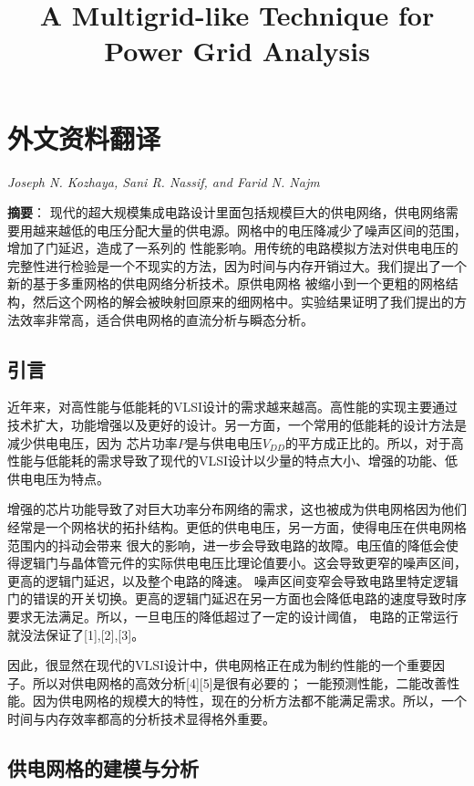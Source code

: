 \chapter{外文资料翻译}
\label{cha:engorg}

\title{A Multigrid-like Technique for Power Grid Analysis}
\begin{center}\emph{Joseph N. Kozhaya, Sani R. Nassif, and Farid N. Najm}\end{center}
\textbf{摘要}：
现代的超大规模集成电路设计里面包括规模巨大的供电网络，供电网络需要用越来越低的电压分配大量的供电源。网格中的电压降减少了噪声区间的范围，增加了门延迟，造成了一系列的
性能影响。用传统的电路模拟方法对供电电压的完整性进行检验是一个不现实的方法，因为时间与内存开销过大。我们提出了一个新的基于多重网格的供电网络分析技术。原供电网格
被缩小到一个更粗的网格结构，然后这个网格的解会被映射回原来的细网格中。实验结果证明了我们提出的方法效率非常高，适合供电网格的直流分析与瞬态分析。

\section{引言}

近年来，对高性能与低能耗的VLSI设计的需求越来越高。高性能的实现主要通过技术扩大，功能增强以及更好的设计。另一方面，一个常用的低能耗的设计方法是减少供电电压，因为
芯片功率$P$是与供电电压$V_{DD}$的平方成正比的。所以，对于高性能与低能耗的需求导致了现代的VLSI设计以少量的特点大小、增强的功能、低供电电压为特点。

增强的芯片功能导致了对巨大功率分布网络的需求，这也被成为供电网格因为他们经常是一个网格状的拓扑结构。更低的供电电压，另一方面，使得电压在供电网格范围内的抖动会带来
很大的影响，进一步会导致电路的故障。电压值的降低会使得逻辑门与晶体管元件的实际供电电压比理论值要小。这会导致更窄的噪声区间，更高的逻辑门延迟，以及整个电路的降速。
噪声区间变窄会导致电路里特定逻辑门的错误的开关切换。更高的逻辑门延迟在另一方面也会降低电路的速度导致时序要求无法满足。所以，一旦电压的降低超过了一定的设计阈值，
电路的正常运行就没法保证了[1],[2],[3]。

因此，很显然在现代的VLSI设计中，供电网格正在成为制约性能的一个重要因子。所以对供电网格的高效分析[4][5]是很有必要的；
一能预测性能，二能改善性能。因为供电网格的规模大的特性，现在的分析方法都不能满足需求。所以，一个时间与内存效率都高的分析技术显得格外重要。

\section{供电网格的建模与分析}

